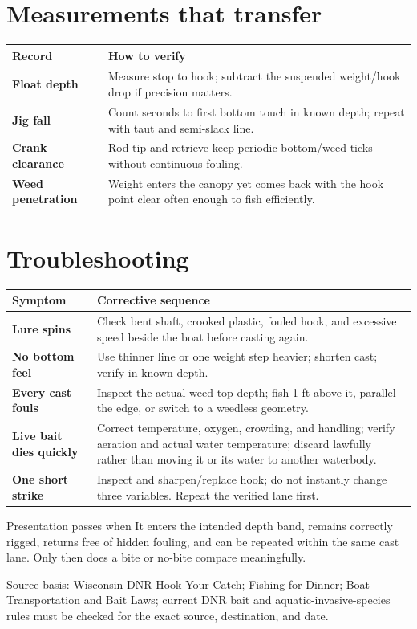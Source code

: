\section{Measurements that transfer}
\begin{tabularx}{\linewidth}{@{}>{\bfseries}p{.24\linewidth}X@{}}
\toprule Record&How to verify\\\midrule
Float depth&Measure stop to hook; subtract the suspended weight/hook drop if
precision matters.\\
Jig fall&Count seconds to first bottom touch in known depth; repeat with taut
and semi-slack line.\\
Crank clearance&Rod tip and retrieve keep periodic bottom/weed ticks without
continuous fouling.\\
Weed penetration&Weight enters the canopy yet comes back with the hook point
clear often enough to fish efficiently.\\
\bottomrule
\end{tabularx}

\section{Troubleshooting}
\begin{tabularx}{\linewidth}{@{}>{\bfseries}p{.24\linewidth}X@{}}
\toprule Symptom&Corrective sequence\\\midrule
Lure spins&Check bent shaft, crooked plastic, fouled hook, and excessive speed
beside the boat before casting again.\\
No bottom feel&Use thinner line or one weight step heavier; shorten cast; verify
in known depth.\\
Every cast fouls&Inspect the actual weed-top depth; fish 1 ft above it, parallel
the edge, or switch to a weedless geometry.\\
Live bait dies quickly&Correct temperature, oxygen, crowding, and handling;
verify aeration and actual water temperature; discard lawfully rather than
moving it or its water to another waterbody.\\
One short strike&Inspect and sharpen/replace hook; do not instantly change
three variables. Repeat the verified lane first.\\
\bottomrule
\end{tabularx}
\begin{telospanel}{Presentation passes when}
It enters the intended depth band, remains correctly rigged, returns free of
hidden fouling, and can be repeated within the same cast lane. Only then does a
bite or no-bite compare meaningfully.
\end{telospanel}
\small Source basis: Wisconsin DNR Hook Your Catch; Fishing for Dinner; Boat
Transportation and Bait Laws; current DNR bait and aquatic-invasive-species
rules must be checked for the exact source, destination, and date.

